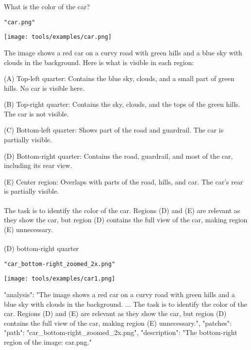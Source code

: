 \begin{textcolorbox}
 What is the color of the car?

 \texttt{"car.png"}

\vspace{0.2cm}
\texttt{[image: tools/examples/car.png]}
\vspace{0.2cm}


The image shows a red car on a curvy road with green hills and a blue sky with clouds in the background. Here is what is visible in each region:

\quad (A) Top-left quarter: Contains the blue sky, clouds, and a small part of green hills. No car is visible here.

\quad (B) Top-right quarter: Contains the sky, clouds, and the tops of the green hills. The car is not visible.

\quad (C) Bottom-left quarter: Shows part of the road and guardrail. The car is partially visible.

\quad (D) Bottom-right quarter: Contains the road, guardrail, and most of the car, including its rear view.

\quad (E) Center region: Overlaps with parts of the road, hills, and car. The car's rear is partially visible.
\\\\
The task is to identify the color of the car. Regions (D) and (E) are relevant as they show the car, but region (D) contains the full view of the car, making region (E) unnecessary.
\\\\
 (D) bottom-right quarter

 \texttt{"car\_bottom-right\_zoomed\_2x.png"}

\vspace{0.2cm}
\texttt{[image: tools/examples/car1.png]}
\vspace{0.2cm}

\begin{codebox}
{
    "analysis": "The image shows a red car on a curvy road with green hills and a blue sky with clouds in the background. ... The task is to identify the color of the car. Regions (D) and (E) are relevant as they show the car, but region (D) contains the full view of the car, making region (E) unnecessary.",
    "patches": 
     {
         "path": "car_bottom-right_zoomed_2x.png",
         "description": "The bottom-right region of the image: car.png."
     }
}
\end{codebox}

\end{textcolorbox}




